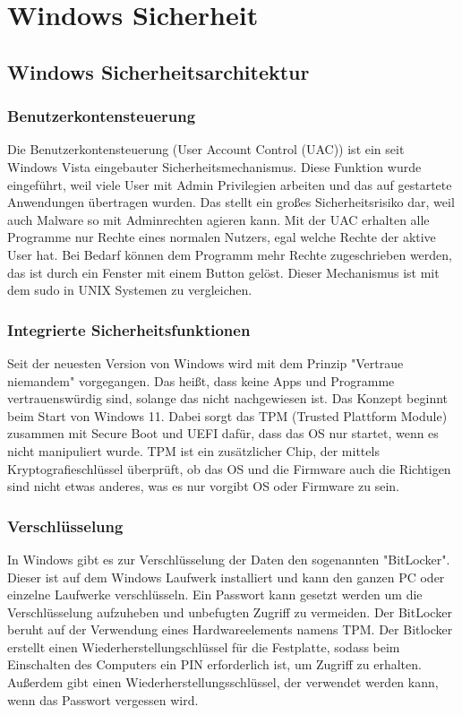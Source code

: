 \section{Windows Sicherheit}

\subsection{Windows Sicherheitsarchitektur}

\subsubsection{Benutzerkontensteuerung}

Die Benutzerkontensteuerung (User Account Control (UAC)) ist ein seit Windows Vista eingebauter Sicherheitsmechanismus. Diese Funktion wurde eingeführt, weil viele User mit Admin Privilegien arbeiten und das auf gestartete Anwendungen übertragen wurden. Das stellt ein großes Sicherheitsrisiko dar, weil auch Malware so mit Adminrechten agieren kann. Mit der UAC erhalten alle Programme nur Rechte eines normalen Nutzers, egal welche Rechte der aktive User hat. Bei Bedarf können dem Programm mehr Rechte zugeschrieben werden, das ist durch ein Fenster mit einem Button gelöst. Dieser Mechanismus ist mit dem sudo in UNIX Systemen zu vergleichen.

\subsubsection{Integrierte Sicherheitsfunktionen}

Seit der neuesten Version von Windows wird mit dem Prinzip "Vertraue niemandem" vorgegangen. Das heißt, dass keine Apps und Programme vertrauenswürdig sind, solange das nicht nachgewiesen ist. Das Konzept beginnt beim Start von Windows 11. Dabei sorgt das TPM (Trusted Plattform Module) zusammen mit Secure Boot und UEFI dafür, dass das OS nur startet, wenn es nicht manipuliert wurde. TPM ist ein zusätzlicher Chip, der mittels Kryptografieschlüssel überprüft, ob das OS und die Firmware auch die Richtigen sind nicht etwas anderes, was es nur vorgibt OS oder Firmware zu sein.

\subsubsection{Verschlüsselung}

In Windows gibt es zur Verschlüsselung der Daten den sogenannten "BitLocker". Dieser ist auf dem Windows Laufwerk installiert und kann den ganzen PC oder einzelne Laufwerke verschlüsseln. Ein Passwort kann gesetzt werden um die Verschlüsselung aufzuheben und unbefugten Zugriff zu vermeiden. Der BitLocker beruht auf der Verwendung eines Hardwareelements namens TPM. Der Bitlocker erstellt einen Wiederherstellungschlüssel für die Festplatte, sodass beim Einschalten des Computers ein PIN erforderlich ist, um Zugriff zu erhalten. Außerdem gibt einen Wiederherstellungsschlüssel, der verwendet werden kann, wenn das Passwort vergessen wird.

